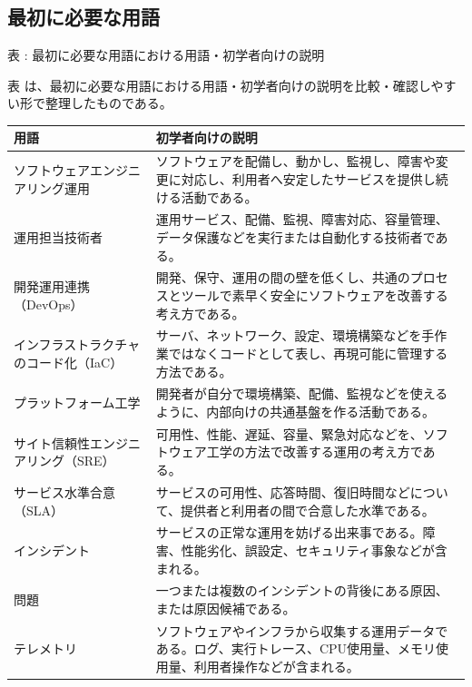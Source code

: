 \subsection*{最初に必要な用語}

\par\smallskip\noindent{}\label{tab:ch06-01}表 \thetable: 最初に必要な用語における用語・初学者向けの説明\par\smallskip
表 \thetable は、最初に必要な用語における用語・初学者向けの説明を比較・確認しやすい形で整理したものである。\par\smallskip
\begin{longtable}{L{35mm}L{115mm}}
\toprule
用語 & 初学者向けの説明 \\
\midrule
ソフトウェアエンジニアリング運用 & ソフトウェアを配備し、動かし、監視し、障害や変更に対応し、利用者へ安定したサービスを提供し続ける活動である。 \\
運用担当技術者 & 運用サービス、配備、監視、障害対応、容量管理、データ保護などを実行または自動化する技術者である。 \\
開発運用連携（DevOps） & 開発、保守、運用の間の壁を低くし、共通のプロセスとツールで素早く安全にソフトウェアを改善する考え方である。 \\
インフラストラクチャのコード化（IaC） & サーバ、ネットワーク、設定、環境構築などを手作業ではなくコードとして表し、再現可能に管理する方法である。 \\
プラットフォーム工学 & 開発者が自分で環境構築、配備、監視などを使えるように、内部向けの共通基盤を作る活動である。 \\
サイト信頼性エンジニアリング（SRE） & 可用性、性能、遅延、容量、緊急対応などを、ソフトウェア工学の方法で改善する運用の考え方である。 \\
サービス水準合意（SLA） & サービスの可用性、応答時間、復旧時間などについて、提供者と利用者の間で合意した水準である。 \\
インシデント & サービスの正常な運用を妨げる出来事である。障害、性能劣化、誤設定、セキュリティ事象などが含まれる。 \\
問題 & 一つまたは複数のインシデントの背後にある原因、または原因候補である。 \\
テレメトリ & ソフトウェアやインフラから収集する運用データである。ログ、実行トレース、CPU使用量、メモリ使用量、利用者操作などが含まれる。 \\
\bottomrule
\end{longtable}
